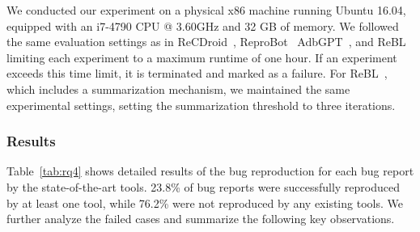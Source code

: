 We conducted our experiment on a physical x86 machine running Ubuntu 16.04, equipped with an i7-4790 CPU @ 3.60GHz and 32 GB of memory. We followed the same evaluation settings as in ReCDroid~\cite{zhao2019recdroid}, 
ReproBot~\cite{zhang2023automatically}
AdbGPT~\cite{feng2024prompting}, and ReBL~\cite{wang2024feedback} limiting each experiment to a maximum runtime of one hour. If an experiment exceeds this time limit, it is terminated and marked as a failure. For ReBL~\cite{wang2024feedback}, which includes a summarization mechanism, we maintained the same experimental settings, setting the summarization threshold to three iterations.


\subsubsection{Results} 
Table~\ref{tab:rq4} shows detailed results of the bug reproduction for each bug report by the state-of-the-art tools. 23.8\% of bug reports were successfully reproduced by at least one tool, while 76.2\% were not reproduced by any existing tools. We further analyze the failed cases and summarize the following key observations.




